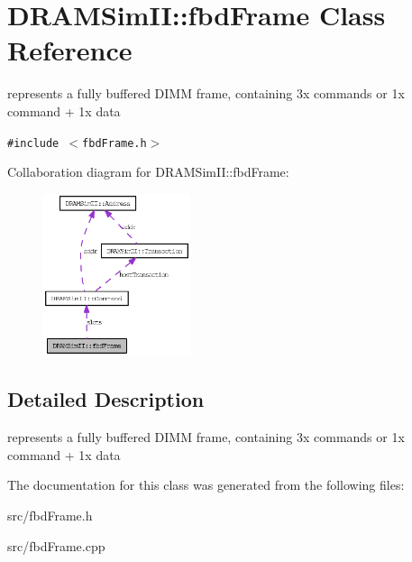 \section{DRAMSimII::fbdFrame Class Reference}
\label{class_d_r_a_m_sim_i_i_1_1fbd_frame}
represents a fully buffered DIMM frame, containing 3x commands or 1x command + 1x data  


{\tt \#include $<$fbdFrame.h$>$}

Collaboration diagram for DRAMSimII::fbdFrame:\nopagebreak
\begin{figure}[H]
\begin{center}
\leavevmode
\includegraphics[width=122pt]{class_d_r_a_m_sim_i_i_1_1fbd_frame__coll__graph}
\end{center}
\end{figure}


\subsection{Detailed Description}
represents a fully buffered DIMM frame, containing 3x commands or 1x command + 1x data 

The documentation for this class was generated from the following files:\begin{CompactItemize}
\item 
src/fbdFrame.h\item 
src/fbdFrame.cpp\end{CompactItemize}
